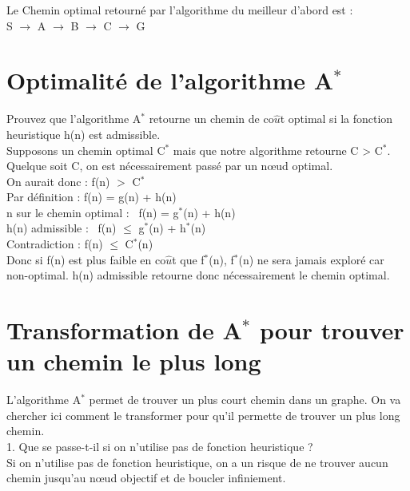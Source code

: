 \documentclass[12pt,a4paper, france]{article}
\newcommand\tab[1][1cm]{\hspace*{#1}}
\begin{document}
Le Chemin optimal retourn\'e par l\textquoteright algorithme du meilleur d\textquoteright abord est : \\
\tab \tab \tab S ${\rightarrow}$ A ${\rightarrow}$ B ${\rightarrow}$ C ${\rightarrow}$ G\\

\section{Optimalit\'e de l\textquoteright algorithme A${^*}$}

Prouvez que l\textquoteright algorithme A${^*}$ retourne un chemin de co${\hat{u}}$t optimal si la fonction heuristique h(n) est admissible. \\

Supposons un chemin optimal C${^*}$ mais que notre algorithme retourne C > C${^*}$. Quelque soit C, on est n\'ecessairement pass\'e par un nœud optimal. \\

On aurait donc : \tab \tab  \;  \;  \; f(n) ${>}$ C${^*}$ \\
\tab Par d\'efinition : \tab \tab \tab f(n) = g(n) + h(n) \\
\tab n sur le chemin optimal : \tab \, f(n) = g${^*}$(n) + h(n) \\
\tab h(n) admissible :  \tab \tab \; \; \, f(n) ${\le}$ g${^*}$(n) + h${^*}$(n) \\
\tab Contradiction : \tab \tab \tab f(n) ${\le}$ C${^*}$(n) \\

Donc si f(n) est plus faible en co${\hat{u}}$t que f${^*}$(n), f${^*}$(n) ne sera jamais explor\'e car non-optimal. h(n) admissible retourne donc n\'ecessairement le chemin optimal.

\section{Transformation de A${^*}$ pour trouver un chemin le plus long}

L\textquoteright algorithme A${^*}$  permet de trouver un plus court chemin dans un graphe. On va chercher ici
comment le transformer pour qu\textquoteright il permette de trouver un plus long chemin. \\

1. Que se passe-t-il si on n\textquoteright utilise pas de fonction heuristique ? \\

Si on n\textquoteright utilise pas de fonction heuristique, on a un risque de ne trouver aucun chemin jusqu\textquoteright au nœud objectif et de boucler infiniement.\\ 
\end{document}
